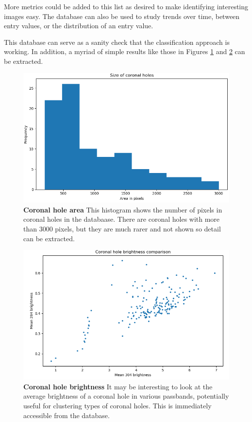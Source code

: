 \documentclass[twoside]{report}
\begin{document}
More metrics could be added to this list as desired to make identifying interesting images easy. The database can also be used to study trends over time, between entry values, or the distribution of an entry value.

This database can serve as a sanity check that the classification approach is working. In addition, a myriad of simple results like those in Figures \ref{fig:coronal_hole_area} and \ref{fig:coronal_hole_brightness} can be extracted.

\begin{figure}
  \begin{center}
    \includegraphics[scale=0.6]{coronal_hole_area}
    \caption{{\bf Coronal hole area} This histogram shows the number of pixels in coronal holes in the databaase. There are coronal holes with more than 3000 pixels, but they are much rarer and not shown so detail can be extracted.}
    \label{fig:coronal_hole_area}
 \end{center}
\end{figure}

\begin{figure}
  \begin{center}
    \includegraphics[scale=0.6]{coronal_hole_brightness}
    \caption{{\bf Coronal hole brightness} It may be interesting to look at the average brightness of a coronal hole in various passbands, potentially useful for clustering types of coronal holes. This is immediately accessible from the database. }
    \label{fig:coronal_hole_brightness}
 \end{center}
\end{figure}
\end{document}
